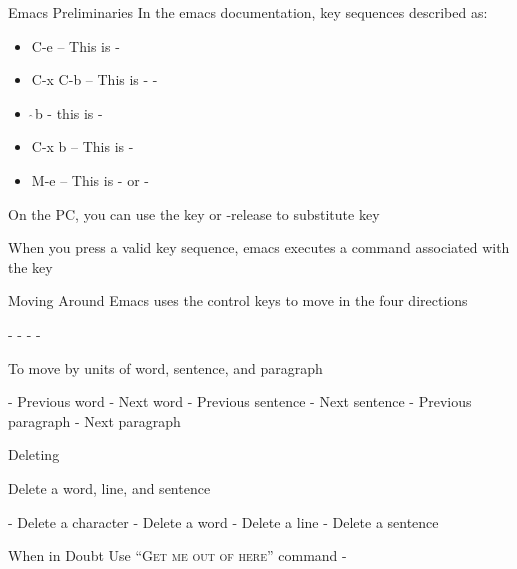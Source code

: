 \documentclass[newPxFont,sthlmFooter,nooffset]{beamer}
\begin{document}
\begin{frame}[t]{Emacs Preliminaries}
In the emacs documentation, key sequences described as:
\begin{itemize}
\item C-e – This is -
\item C-x C-b – This is - -
\item $\hat{~}$b - this is - \
\item C-x b – This is - 
\item M-e – This is \keystroke{Meta}-\keystroke{e} or -
\end{itemize}

\bigskip
On the PC, you can use the  key or -release to substitute  key

\bigskip
When you press a valid key sequence, emacs executes a command associated with the key
\end{frame}




\begin{frame}[t]{Moving Around}
Emacs uses the control keys to move in the four directions
\bigskip

- \keystroke{$\leftarrow$} \hfill
{}-\keystrokered{n} \keystroke{$\downarrow$} \hfill
{}-\keystrokered{p} \keystroke{$\uparrow$} \hfill
\keystrokered{Ctrl}-\keystrokered{f} \keystroke{$\rightarrow$} \hfill



\bigskip
To move by units of word, sentence, and paragraph

\bigskip
{}- Previous word \hfill
{}- Next word \hfill
{}- Previous sentence \hfill
{}- Next sentence \hfill
{}-\keystrokered{\{} Previous paragraph \hfill
\keystrokered{Meta}-\keystrokered{\}} Next paragraph \hfill


\end{frame}



\begin{frame}[t]{Deleting}

Delete a word, line, and sentence
\bigskip

\keystrokered{Ctrl}- Delete a character \hfill
{}-\keystrokered{d} Delete a word \hfill
{}- Delete a line \hfill
\keystrokered{Meta}-\keystrokered{k} Delete a sentence \hfill

\bigskip
\begin{block}{When in Doubt}
Use ``\textsc{Get me out of here}'' command \keystrokered{Ctrl}-\keystrokered{g}
\end{block}
\end{frame}
\end{document}
